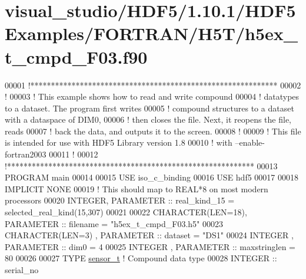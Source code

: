 \hypertarget{visual__studio_2_h_d_f5_21_810_81_2_h_d_f5_examples_2_f_o_r_t_r_a_n_2_h5_t_2h5ex__t__cmpd___f03_8f90_source}{}\section{visual\+\_\+studio/\+H\+D\+F5/1.10.1/\+H\+D\+F5\+Examples/\+F\+O\+R\+T\+R\+A\+N/\+H5\+T/h5ex\+\_\+t\+\_\+cmpd\+\_\+\+F03.f90}
\label{visual__studio_2_h_d_f5_21_810_81_2_h_d_f5_examples_2_f_o_r_t_r_a_n_2_h5_t_2h5ex__t__cmpd___f03_8f90_source}

\begin{DoxyCode}
00001 \textcolor{comment}{!************************************************************}
00002 \textcolor{comment}{!}
00003 \textcolor{comment}{!  This example shows how to read and write compound}
00004 \textcolor{comment}{!  datatypes to a dataset.  The program first writes}
00005 \textcolor{comment}{!  compound structures to a dataset with a dataspace of DIM0,}
00006 \textcolor{comment}{!  then closes the file.  Next, it reopens the file, reads}
00007 \textcolor{comment}{!  back the data, and outputs it to the screen.}
00008 \textcolor{comment}{!}
00009 \textcolor{comment}{!  This file is intended for use with HDF5 Library version 1.8}
00010 \textcolor{comment}{!  with --enable-fortran2003}
00011 \textcolor{comment}{!}
00012 \textcolor{comment}{!************************************************************}
00013 \textcolor{keyword}{PROGRAM} main
00014 
00015   \textcolor{keywordtype}{USE }iso\_c\_binding
00016   \textcolor{keywordtype}{USE }hdf5
00017 
00018   \textcolor{keywordtype}{IMPLICIT NONE}
00019   \textcolor{comment}{! This should map to REAL*8 on most modern processors}
00020   \textcolor{keywordtype}{INTEGER}, \textcolor{keywordtype}{PARAMETER} :: real\_kind\_15 = selected\_real\_kind(15,307)
00021 
00022   \textcolor{keywordtype}{CHARACTER(LEN=18)}, \textcolor{keywordtype}{PARAMETER} :: filename     = \textcolor{stringliteral}{"h5ex\_t\_cmpd\_F03.h5"}
00023   \textcolor{keywordtype}{CHARACTER(LEN=3)} , \textcolor{keywordtype}{PARAMETER} :: dataset      = \textcolor{stringliteral}{"DS1"}
00024   \textcolor{keywordtype}{INTEGER}          , \textcolor{keywordtype}{PARAMETER} :: dim0         = 4
00025   \textcolor{keywordtype}{INTEGER}          , \textcolor{keywordtype}{PARAMETER} :: maxstringlen = 80
00026 
00027   \textcolor{keyword}{TYPE} \hyperlink{structsensor__t}{sensor\_t} \textcolor{comment}{! Compound data type}
00028      \textcolor{keywordtype}{INTEGER} :: serial\_no

\end{DoxyCode}
